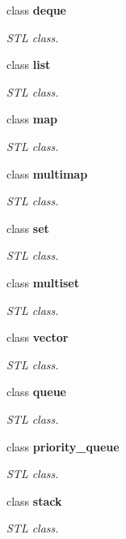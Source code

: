 \begin{DoxyCompactItemize}
class {\bfseries deque}
\begin{DoxyCompactList}\small\item\em STL class. \end{DoxyCompactList}\item 
class {\bfseries list}
\begin{DoxyCompactList}\small\item\em STL class. \end{DoxyCompactList}\item 
class {\bfseries map}
\begin{DoxyCompactList}\small\item\em STL class. \end{DoxyCompactList}\item 
class {\bfseries multimap}
\begin{DoxyCompactList}\small\item\em STL class. \end{DoxyCompactList}\item 
class {\bfseries set}
\begin{DoxyCompactList}\small\item\em STL class. \end{DoxyCompactList}\item 
class {\bfseries multiset}
\begin{DoxyCompactList}\small\item\em STL class. \end{DoxyCompactList}\item 
class {\bfseries vector}
\begin{DoxyCompactList}\small\item\em STL class. \end{DoxyCompactList}\item 
class {\bfseries queue}
\begin{DoxyCompactList}\small\item\em STL class. \end{DoxyCompactList}\item 
class {\bfseries priority\_\-queue}
\begin{DoxyCompactList}\small\item\em STL class. \end{DoxyCompactList}\item 
class {\bfseries stack}
\begin{DoxyCompactList}\small\item\em STL class. \end{DoxyCompactList}\item 

\end{DoxyCompactItemize}
